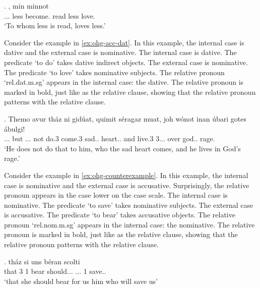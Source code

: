 \exg.    , min minnot\\
... less become. read\scsub{[dat]} less love.\scsub{[nom]}\\
`To whom less is read, loves less.' \label{ex:ohg-nom-dat}

Consider the example in \ref{ex:ohg-acc-dat}. In this example, the internal case is dative and the external case is nominative.
The internal case is dative. The predicate  `to do' takes dative indirect objects.
The external case is nominative. The predicate  `to love' takes nominative subjects.
The relative pronoun  `\ac{rel}.\ac{dat}.\ac{m}.\ac{sg}' appears in the internal case: the dative. The relative pronoun is marked in bold, just like as the relative clause, showing that the relative pronoun patterns with the relative clause.



\exg. Themo avur tház ni gidúat, quimit séragaz muat, joh wónot inan úbari gotes ábulgi!\\
... but ... not do.3 come.3 sad.. heart..
and live.3 3... over god.. rage.\\
`He does not do that to him, who the sad heart comes, and he lives in God's rage.' \label{ex:ohg-acc-dat}


Consider the example in \ref{ex:ohg-counterexample}. In this example, the internal case is nominative and the external case is accusative. Surprisingly, the relative pronoun appears in the case lower on the case scale.
The internal case is nominative. The predicate  `to save' takes nominative subjects.
The external case is accusative. The predicate  `to bear' takes accusative objects.
The relative pronoun  `\ac{rel}.\ac{nom}.\ac{m}.\ac{sg}' appears in the internal case: the nominative. The relative pronoun is marked in bold, just like as the relative clause, showing that the relative pronoun patterns with the relative clause.

\exg. tház si uns béran scolti   \\
 that 3 1 bear should... ... 1 save..\\
 `that she should bear for us him who will save us' \label{ex:ohg-counterexample}

